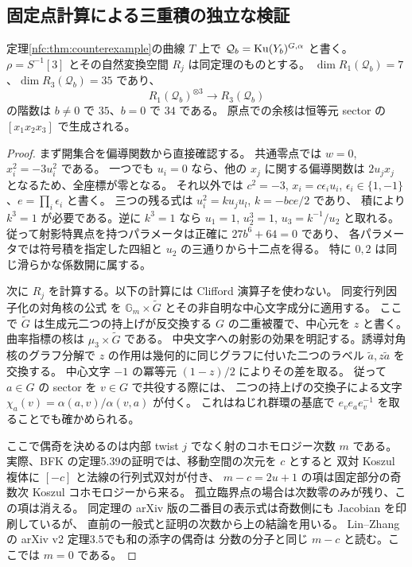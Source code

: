 \subsection{固定点計算による三重積の独立な検証}
\label{nft:sec:triple}
\begin{proposition}\label{nft:prop:triple}
定理\ref{nfc:thm:counterexample}の曲線 $T$ 上で
$\mathcal Q_b=\operatorname{Ku}(Y_b)^{G,\alpha}$ と書く。
$\rho=S^{-1}[3]$ とその自然変換空間 $R_j$ は同定理のものとする。
$\dim R_1(\mathcal Q_b)=7$、$\dim R_3(\mathcal Q_b)=35$ であり、
\[
 R_1(\mathcal Q_b)^{\otimes3}\longrightarrow R_3(\mathcal Q_b)
\]
の階数は $b\ne0$ で $35$、$b=0$ で $34$ である。
原点での余核は恒等元 sector の $[x_1x_2x_3]$ で生成される。
\end{proposition}
\begin{proof}
まず開集合を偏導関数から直接確認する。
共通零点では $w=0$, $x_i^2=-3u_i^2$ である。
一つでも $u_i=0$ なら、他の $x_j$ に関する偏導関数は
$2u_jx_j$ となるため、全座標が零となる。
それ以外では $c^2=-3$, $x_i=c\epsilon_i u_i$,
$\epsilon_i\in\{1,-1\}$、$e=\prod_i\epsilon_i$ と書く。
三つの残る式は $u_i^2=k u_j u_l$, $k=-bce/2$ であり、
積により $k^3=1$ が必要である。逆に $k^3=1$ なら
$u_1=1$, $u_2^3=1$, $u_3=k^{-1}/u_2$ と取れる。
従って射影特異点を持つパラメータは正確に $27b^6+64=0$ であり、
各パラメータでは符号積を指定した四組と $u_2$ の三通りから十二点を得る。
特に $0,2$ は同じ滑らかな係数開に属する。

次に $R_j$ を計算する。以下の計算には Clifford 演算子を使わない。
同変行列因子化の対角核の公式
\cite[Theorem~5.39 and its proof]{NFBFKKernels}を
$\mathbb G_m\times\widetilde G$ とその非自明な中心文字成分に適用する。
ここで $\widetilde G$ は生成元二つの持上げが反交換する
$G$ の二重被覆で、中心元を $z$ と書く。
曲率指標の核は $\mu_3\times\widetilde G$ である。
中央文字への射影の効果を明記する。誘導対角核のグラフ分解で
$z$ の作用は幾何的に同じグラフに付いた二つのラベル
$\widetilde a,z\widetilde a$ を交換する。
中心文字 $-1$ の冪等元 $(1-z)/2$ によりその差を取る。
従って $a\in G$ の sector を $v\in G$ で共役する際には、
二つの持上げの交換子による文字
$\chi_a(v)=\alpha(a,v)/\alpha(v,a)$ が付く。
これはねじれ群環の基底で $e_v e_a e_v^{-1}$ を取ることでも確かめられる。

ここで偶奇を決めるのは内部 twist $j$ でなく射のコホモロジー次数 $m$ である。
実際、BFK の定理5.39の証明では、移動空間の次元を $c$ とすると
双対 Koszul 複体に $[-c]$ と法線の行列式双対が付き、
$m-c=2u+1$ の項は固定部分の奇数次 Koszul コホモロジーから来る。
孤立臨界点の場合は次数零のみが残り、この項は消える。
同定理の arXiv 版の二番目の表示式は奇数側にも Jacobian を印刷しているが、
直前の一般式と証明の次数から上の結論を用いる。
Lin--Zhang の arXiv v2 定理3.5でも和の添字の偶奇は
分数の分子と同じ $m-c$ と読む。ここでは $m=0$ である。


\end{proof}
